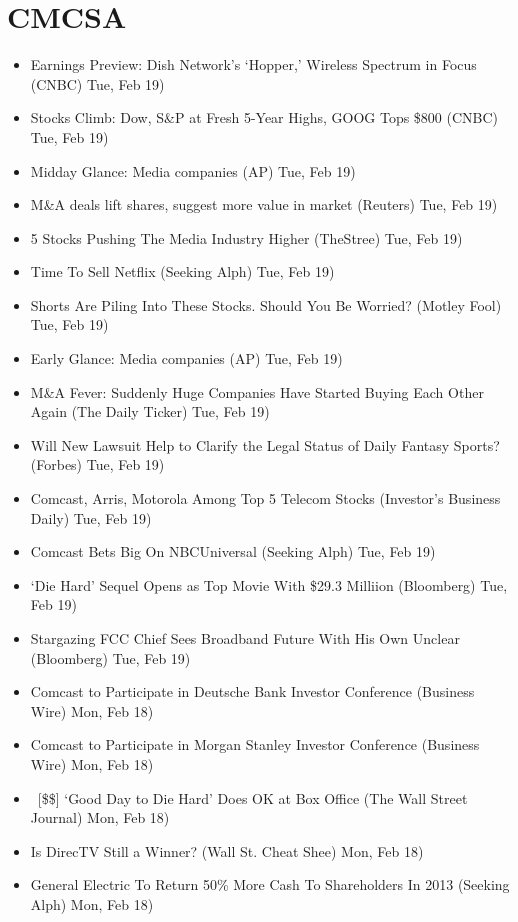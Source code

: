 \documentclass[11pt,asymmetric]{article}
\begin{document}
\section*{CMCSA}
\begin{itemize}
\item Earnings Preview: Dish Network's `Hopper,' Wireless Spectrum in Focus (CNBC) Tue, Feb 19)
\item Stocks Climb: Dow, S\&P at Fresh 5-Year Highs, GOOG Tops \$800 (CNBC) Tue, Feb 19)
\item Midday Glance: Media companies (AP) Tue, Feb 19)
\item M\&A deals lift shares, suggest more value in market (Reuters) Tue, Feb 19)
\item 5 Stocks Pushing The Media Industry Higher (TheStree) Tue, Feb 19)
\item Time To Sell Netflix (Seeking Alph) Tue, Feb 19)
\item Shorts Are Piling Into These Stocks. Should You Be Worried? (Motley Fool) Tue, Feb 19)
\item Early Glance: Media companies (AP) Tue, Feb 19)
\item M\&A Fever: Suddenly Huge Companies Have Started Buying Each Other Again (The Daily Ticker) Tue, Feb 19)
\item Will New Lawsuit Help to Clarify the Legal Status of Daily Fantasy Sports? (Forbes) Tue, Feb 19)
\item Comcast, Arris, Motorola Among Top 5 Telecom Stocks (Investor's Business Daily) Tue, Feb 19)
\item Comcast Bets Big On NBCUniversal (Seeking Alph) Tue, Feb 19)
\item ‘Die Hard’ Sequel Opens as Top Movie With \$29.3 Milliion (Bloomberg) Tue, Feb 19)
\item Stargazing FCC Chief Sees Broadband Future With His Own Unclear (Bloomberg) Tue, Feb 19)
\item Comcast to Participate in Deutsche Bank Investor Conference (Business Wire) Mon, Feb 18)
\item Comcast to Participate in Morgan Stanley Investor Conference (Business Wire) Mon, Feb 18)
\item\ [\$\$] `Good Day to Die Hard' Does OK at Box Office (The Wall Street Journal) Mon, Feb 18)
\item Is DirecTV Still a Winner? (Wall St. Cheat Shee) Mon, Feb 18)
\item General Electric To Return 50\% More Cash To Shareholders In 2013 (Seeking Alph) Mon, Feb 18)

\end{itemize}
\end{document}
